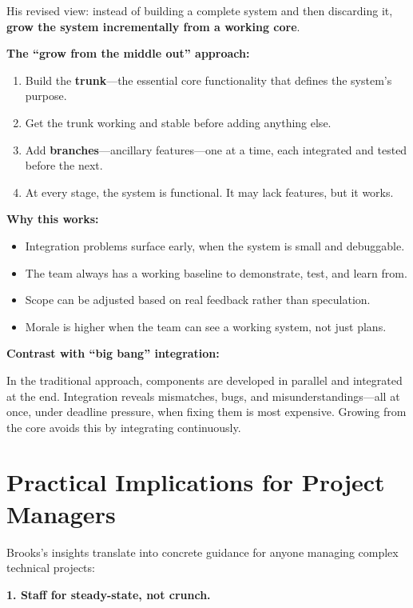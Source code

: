 \documentclass[11pt, letterpaper]{article}
\begin{document}
His revised view: instead of building a complete system and then discarding it, \textbf{grow the system incrementally from a working core}.

\textbf{The ``grow from the middle out'' approach:}

\begin{enumerate}
    \item Build the \textbf{trunk}---the essential core functionality that defines the system's purpose.
    \item Get the trunk working and stable before adding anything else.
    \item Add \textbf{branches}---ancillary features---one at a time, each integrated and tested before the next.
    \item At every stage, the system is functional. It may lack features, but it works.
\end{enumerate}

\textbf{Why this works:}
\begin{itemize}
    \item Integration problems surface early, when the system is small and debuggable.
    \item The team always has a working baseline to demonstrate, test, and learn from.
    \item Scope can be adjusted based on real feedback rather than speculation.
    \item Morale is higher when the team can see a working system, not just plans.
\end{itemize}

\textbf{Contrast with ``big bang'' integration:}

In the traditional approach, components are developed in parallel and integrated at the end. Integration reveals mismatches, bugs, and misunderstandings---all at once, under deadline pressure, when fixing them is most expensive. Growing from the core avoids this by integrating continuously.

\vspace{1em}

\section*{Practical Implications for Project Managers}

Brooks's insights translate into concrete guidance for anyone managing complex technical projects:

\textbf{1. Staff for steady-state, not crunch.}
\end{document}
